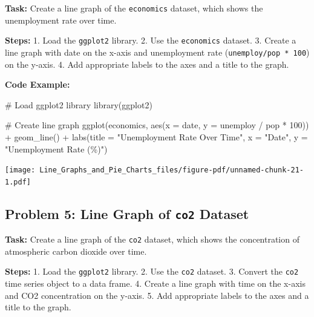 \documentclass[
  letterpaper,
  DIV=11,
  numbers=noendperiod]{scrreprt}
\newenvironment{Shaded}{\begin{snugshade}}{\end{snugshade}}
\newcommand{\AttributeTok}[1]{\textcolor[rgb]{0.40,0.45,0.13}{#1}}
\newcommand{\CommentTok}[1]{\textcolor[rgb]{0.37,0.37,0.37}{#1}}
\newcommand{\DecValTok}[1]{\textcolor[rgb]{0.68,0.00,0.00}{#1}}
\newcommand{\FunctionTok}[1]{\textcolor[rgb]{0.28,0.35,0.67}{#1}}
\newcommand{\NormalTok}[1]{\textcolor[rgb]{0.00,0.23,0.31}{#1}}
\newcommand{\SpecialCharTok}[1]{\textcolor[rgb]{0.37,0.37,0.37}{#1}}
\newcommand{\StringTok}[1]{\textcolor[rgb]{0.13,0.47,0.30}{#1}}
\begin{document}
\textbf{Task:} Create a line graph of the \texttt{economics} dataset,
which shows the unemployment rate over time.

\textbf{Steps:} 1. Load the \texttt{ggplot2} library. 2. Use the
\texttt{economics} dataset. 3. Create a line graph with date on the
x-axis and unemployment rate (\texttt{unemploy/pop\ *\ 100}) on the
y-axis. 4. Add appropriate labels to the axes and a title to the graph.

\textbf{Code Example:}

\begin{Shaded}
\begin{Highlighting}[]
\CommentTok{\# Load ggplot2 library}
\FunctionTok{library}\NormalTok{(ggplot2)}

\CommentTok{\# Create line graph}
\FunctionTok{ggplot}\NormalTok{(economics, }\FunctionTok{aes}\NormalTok{(}\AttributeTok{x =}\NormalTok{ date, }\AttributeTok{y =}\NormalTok{ unemploy }\SpecialCharTok{/}\NormalTok{ pop }\SpecialCharTok{*} \DecValTok{100}\NormalTok{)) }\SpecialCharTok{+}
  \FunctionTok{geom\_line}\NormalTok{() }\SpecialCharTok{+}
  \FunctionTok{labs}\NormalTok{(}\AttributeTok{title =} \StringTok{"Unemployment Rate Over Time"}\NormalTok{,}
       \AttributeTok{x =} \StringTok{"Date"}\NormalTok{,}
       \AttributeTok{y =} \StringTok{"Unemployment Rate (\%)"}\NormalTok{)}
\end{Highlighting}
\end{Shaded}

\texttt{[image: Line\_Graphs\_and\_Pie\_Charts\_files/figure-pdf/unnamed-chunk-21-1.pdf]}

\subsection*{\texorpdfstring{Problem 5: Line Graph of \texttt{co2}
Dataset}{Problem 5: Line Graph of co2 Dataset}}\label{problem-5-line-graph-of-co2-dataset}

\textbf{Task:} Create a line graph of the \texttt{co2} dataset, which
shows the concentration of atmospheric carbon dioxide over time.

\textbf{Steps:} 1. Load the \texttt{ggplot2} library. 2. Use the
\texttt{co2} dataset. 3. Convert the \texttt{co2} time series object to
a data frame. 4. Create a line graph with time on the x-axis and CO2
concentration on the y-axis. 5. Add appropriate labels to the axes and a
title to the graph.
\end{document}
